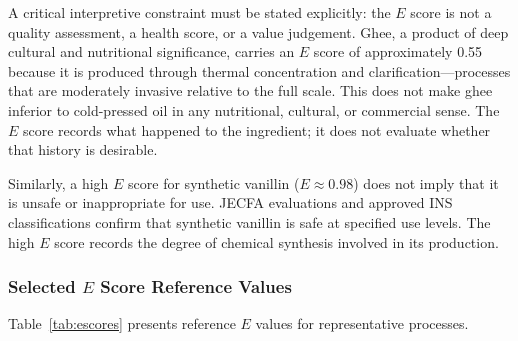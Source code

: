 \documentclass[12pt,a3paper]{article}
\begin{document}
A critical interpretive constraint must be stated explicitly: the $E$ score is not a quality assessment, a health score, or a value judgement. Ghee, a product of deep cultural and nutritional significance, carries an $E$ score of approximately 0.55 because it is produced through thermal concentration and clarification---processes that are moderately invasive relative to the full scale. This does not make ghee inferior to cold-pressed oil in any nutritional, cultural, or commercial sense. The $E$ score records what happened to the ingredient; it does not evaluate whether that history is desirable.

Similarly, a high $E$ score for synthetic vanillin ($E \approx 0.98$) does not imply that it is unsafe or inappropriate for use. JECFA evaluations and approved INS classifications confirm that synthetic vanillin is safe at specified use levels. The high $E$ score records the degree of chemical synthesis involved in its production.

\subsubsection{Selected $E$ Score Reference Values}

Table~\ref{tab:escores} presents reference $E$ values for representative processes.
\end{document}
